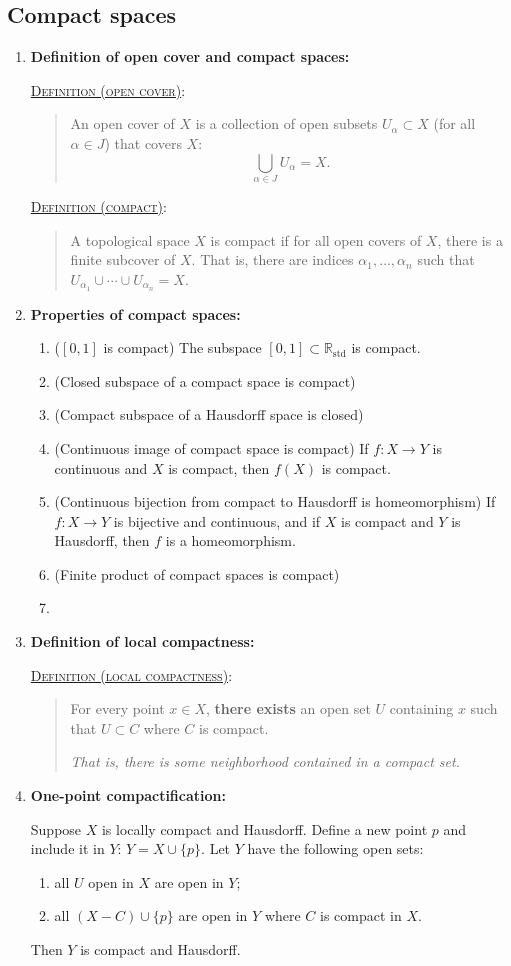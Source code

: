 \documentclass[letterpaper, 12pt]{article}
\newcommand{\RR}{\mathbb{R}}
\newcommand{\defn}[2]{\textsc{\underline{Definition (#1)}:}\begin{quote} #2\end{quote}}
\begin{document}
    \subsection{Compact spaces}
        \begin{enumerate}[resume]
        \item \textbf{Definition of open cover and compact spaces:}

            \defn{open cover}{An open cover of $X$ is a collection of open subsets $U_\alpha\subset X$ (for all $\alpha\in J$) that covers $X$: \[\bigcup_{\alpha\in J} U_\alpha = X.\]}

            \defn{compact}{A topological space $X$ is compact if for all open covers of $X$, there is a finite subcover of $X$. That is, there are indices $\alpha_1, \dots, \alpha_n$ such that $U_{\alpha_1}\cup\cdots\cup U_{\alpha_n} = X$.}
        \item \textbf{Properties of compact spaces:}
            \begin{enumerate}
                \item ($[0,1]$ is compact) The subspace $[0,1]\subset \RR_\text{std}$ is compact.
                \item (Closed subspace of a compact space is compact)
                \item (Compact subspace of a Hausdorff space is closed)
                \item (Continuous image of compact space is compact) If $f:X\to Y$ is continuous and $X$ is compact, then $f(X)$ is compact.
                \item (Continuous bijection from compact to Hausdorff is homeomorphism) If $f:X\to Y$ is bijective and continuous, and if $X$ is compact and $Y$ is Hausdorff, then $f$ is a homeomorphism.
                \item (Finite product of compact spaces is compact)
                \item 
            \end{enumerate}
        \item \textbf{Definition of local compactness:}

            \defn{local compactness}{For every point $x\in X$, \textbf{there exists} an open set $U$ containing $x$ such that $U\subset C$ where $C$ is compact.

            \textit{That is, there is some neighborhood contained in a compact set.}}
        \item \textbf{One-point compactification:}

            Suppose $X$ is locally compact and Hausdorff. Define a new point $p$ and include it in $Y$: $Y = X\cup \{p\}$. Let $Y$ have the following open sets:
            \begin{enumerate}
            \item all $U$ open in $X$ are open in $Y$;
            \item all $(X-C)\cup\{p\}$ are open in $Y$ where $C$ is compact in $X$.
            \end{enumerate}
            Then $Y$ is compact and Hausdorff.
        \end{enumerate}
\end{document}
